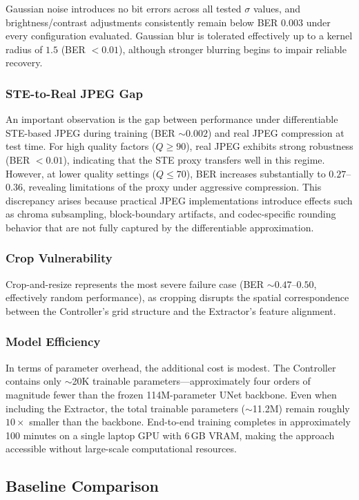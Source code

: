 \documentclass[conference]{IEEEtran}
\begin{document}
Gaussian noise introduces no bit errors across all tested $\sigma$ values, and brightness/contrast adjustments consistently remain below BER $0.003$ under every configuration evaluated.
Gaussian blur is tolerated effectively up to a kernel radius of $1.5$ (BER $< 0.01$), although stronger blurring begins to impair reliable recovery.

\subsubsection{STE-to-Real JPEG Gap}
An important observation is the gap between performance under differentiable STE-based JPEG during training (BER $\sim 0.002$) and real JPEG compression at test time.
For high quality factors ($Q \geq 90$), real JPEG exhibits strong robustness (BER $< 0.01$), indicating that the STE proxy transfers well in this regime.
However, at lower quality settings ($Q \leq 70$), BER increases substantially to $0.27$--$0.36$, revealing limitations of the proxy under aggressive compression.
This discrepancy arises because practical JPEG implementations introduce effects such as chroma subsampling, block-boundary artifacts, and codec-specific rounding behavior that are not fully captured by the differentiable approximation.

\subsubsection{Crop Vulnerability}
Crop-and-resize represents the most severe failure case (BER $\sim 0.47$--$0.50$, effectively random performance), as cropping disrupts the spatial correspondence between the Controller’s grid structure and the Extractor’s feature alignment.

\subsubsection{Model Efficiency}
In terms of parameter overhead, the additional cost is modest.
The Controller contains only $\sim$20K trainable parameters—approximately four orders of magnitude fewer than the frozen 114M-parameter UNet backbone.
Even when including the Extractor, the total trainable parameters ($\sim$11.2M) remain roughly $10\times$ smaller than the backbone.
End-to-end training completes in approximately 100 minutes on a single laptop GPU with 6\,GB VRAM, making the approach accessible without large-scale computational resources.


\subsection{Baseline Comparison}
\label{sec:baselines}
\end{document}
